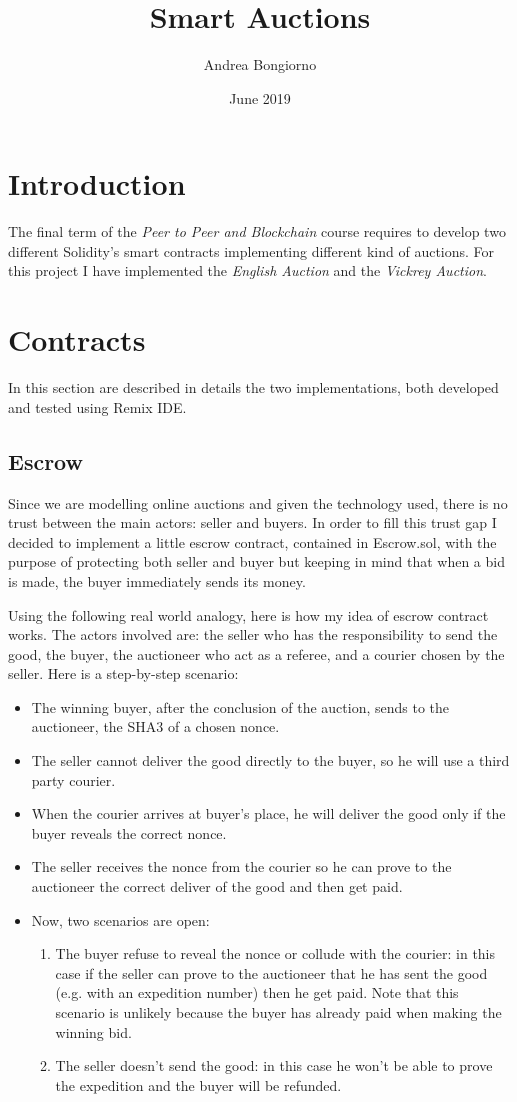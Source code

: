 \documentclass{article}
\title{Smart Auctions}
\author{Andrea Bongiorno}
\date{June 2019}
\begin{document}
\maketitle
\newpage
\tableofcontents
\newpage
\section{Introduction}
The final term of the \textit{Peer to Peer and Blockchain} course requires to develop two different Solidity's smart contracts implementing different kind of auctions. For this project I have implemented the \textit{English Auction} and the \textit{Vickrey Auction}.
\section{Contracts}
In this section are described in details the two implementations, both developed and tested using Remix IDE.
\subsection{Escrow}\label{escrow}
Since we are modelling online auctions and given the technology used, there is no trust between the main actors: seller and buyers.
In order to fill this trust gap I decided to implement a little escrow contract, contained in Escrow.sol, with the purpose of protecting both seller and buyer but keeping in mind that when a bid is made, the buyer immediately sends its money.

Using the following real world analogy, here is how my idea of escrow contract works. The actors involved are: the seller who has the responsibility to send the good, the buyer, the auctioneer who act as a referee, and a courier chosen by the seller. Here is a step-by-step scenario:
\begin{itemize}
    \item The winning buyer, after the conclusion of the auction, sends to the auctioneer, the SHA3 of a chosen nonce.
    \item The seller cannot deliver the good directly to the buyer, so he will use a third party courier.
    \item When the courier arrives at buyer's place, he will deliver the good only if the buyer reveals the correct nonce. 
    \item The seller receives the nonce from the courier so he can prove to the auctioneer the correct deliver of the good and then get paid.
    \item Now, two scenarios are open:
    \begin{enumerate}
        \item The buyer refuse to reveal the nonce or collude with the courier: in this case if the seller can prove to the auctioneer that he has sent the good (e.g. with an expedition number) then he get paid. Note that this scenario is unlikely because the buyer has already paid when making the winning bid.
        \item The seller doesn't send the good: in this case he won't be able to prove the expedition and the buyer will be refunded.
    \end{enumerate}
\end{itemize}
\end{document}
